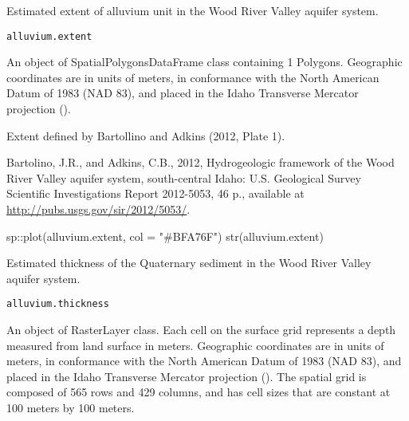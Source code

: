 \documentclass[a4paper]{book}
\begin{document}
%
\begin{Description}\relax
Estimated extent of alluvium unit in the Wood River Valley aquifer system.
\end{Description}
%
\begin{Usage}
\begin{verbatim}
alluvium.extent
\end{verbatim}
\end{Usage}
%
\begin{Format}
An object of SpatialPolygonsDataFrame class containing 1 Polygons.
Geographic coordinates are in units of meters, in conformance with the
North American Datum of 1983 (NAD 83), and placed in the
Idaho Transverse Mercator projection ().
\end{Format}
%
\begin{Source}\relax
Extent defined by Bartollino and Adkins (2012, Plate 1).
\end{Source}
%
\begin{References}\relax
Bartolino, J.R., and Adkins, C.B., 2012,
Hydrogeologic framework of the Wood River Valley aquifer system, south-central Idaho:
U.S. Geological Survey Scientific Investigations Report 2012-5053, 46 p.,
available at \url{http://pubs.usgs.gov/sir/2012/5053/}.
\end{References}
%
\begin{Examples}
\begin{ExampleCode}
sp::plot(alluvium.extent, col = "#BFA76F")
str(alluvium.extent)

\end{ExampleCode}
\end{Examples}
%
\begin{Description}\relax
Estimated thickness of the Quaternary sediment in the Wood River Valley aquifer system.
\end{Description}
%
\begin{Usage}
\begin{verbatim}
alluvium.thickness
\end{verbatim}
\end{Usage}
%
\begin{Format}
An object of RasterLayer class.
Each cell on the surface grid represents a depth measured from land surface in meters.
Geographic coordinates are in units of meters, in conformance with the
North American Datum of 1983 (NAD 83), and placed in the
Idaho Transverse Mercator projection ().
The spatial grid is composed of 565 rows and 429 columns,
and has cell sizes that are constant at 100 meters by 100 meters.
\end{Format}
\end{document}
